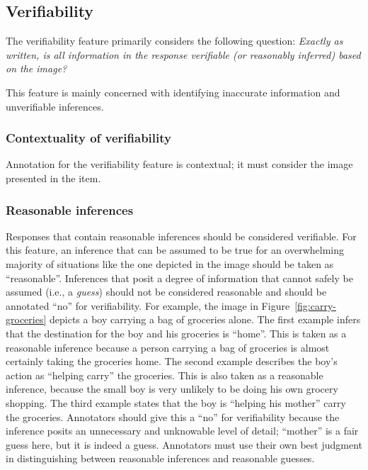 \documentclass[12pt,notitlepage]{article}
\begin{document}
\subsection{Verifiability} \label{subsec:verifiability}

The verifiability feature primarily considers the following question: \textit{Exactly as written, is all information in the response verifiable (or reasonably inferred) based on the image?}

This feature is mainly concerned with identifying inaccurate information and unverifiable inferences. 

\subsubsection{Contextuality of verifiability} Annotation for the verifiability feature is contextual; it must consider the image presented in the item. 

\subsubsection{Reasonable inferences} Responses that contain reasonable inferences should be considered verifiable. For this feature, an inference that can be assumed to be true for an overwhelming majority of situations like the one depicted in the image should be taken as ``reasonable''. Inferences that posit a degree of information that cannot safely be assumed (i.e., a \textit{guess}) should not be considered reasonable and should be annotated ``no'' for verifiability. For example, the image in Figure~\ref{fig:carry-groceries} depicts a boy carrying a bag of groceries alone. The first example infers that the destination for the boy and his groceries is ``home''. This is taken as a reasonable inference because a person carrying a bag of groceries is almost certainly taking the groceries home. The second example describes the boy's action as ``helping carry'' the groceries. This is also taken as a reasonable inference, because the small boy is very unlikely to be doing his own grocery shopping. The third example states that the boy is ``helping his mother'' carry the groceries. Annotators should give this a ``no'' for verifiability because the inference posits an unnecessary and unknowable level of detail; ``mother'' is a fair guess here, but it is indeed a guess. Annotators must use their own best judgment in distinguishing between reasonable inferences and reasonable guesses.
\end{document}
